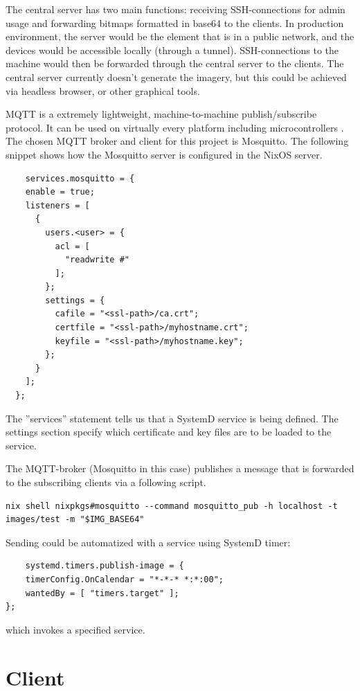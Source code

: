 The central server has two main functions: receiving SSH-connections for admin usage and forwarding bitmaps formatted in base64 to the clients. In production environment, the server would be the element that is in a public network, and the devices would be accessible locally (through a tunnel). SSH-connections to the machine would then be forwarded through the central server to the clients. The central server currently doesn't generate the imagery, but this could be achieved via headless browser, or other graphical tools.

MQTT is a extremely lightweight, machine-to-machine publish/subscribe protocol. It can be used on virtually every platform including microcontrollers \cite{oasisopenMQTTVersion}. The chosen MQTT broker and client for this project is Mosquitto. The following snippet shows how the Mosquitto server is configured in the NixOS server. 

\begin{lstlisting}
    services.mosquitto = {
    enable = true;
    listeners = [
      {
        users.<user> = {
          acl = [
            "readwrite #"
          ];
        };
        settings = {
          cafile = "<ssl-path>/ca.crt";
          certfile = "<ssl-path>/myhostname.crt";
          keyfile = "<ssl-path>/myhostname.key";
        };
      }
    ];
  };
\end{lstlisting}

The ''services'' statement tells us that a SystemD service is being defined. The settings section specify which certificate and key files are to be loaded to the service.

The MQTT-broker (Mosquitto in this case) publishes a message that is forwarded to the subscribing clients via a following script.

\begin{lstlisting}
nix shell nixpkgs#mosquitto --command mosquitto_pub -h localhost -t images/test -m "$IMG_BASE64"
\end{lstlisting}

Sending could be automatized with a service using SystemD timer: 
\begin{lstlisting}
    systemd.timers.publish-image = {
    timerConfig.OnCalendar = "*-*-* *:*:00";
    wantedBy = [ "timers.target" ];
};
\end{lstlisting}

which invokes a specified service.

\section{Client}

